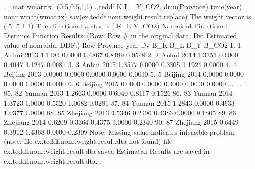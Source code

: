 . 
. mat wmatrix=(0.5,0.5,1,1)
{\smallskip}
. teddf K L= Y: CO2, dmu(Province) time(year) nonr wmat(wmatrix) sav(ex.teddf.nonr.weight.result,replace)
{\smallskip}
 The weight vector is (.5 .5 1 1)
{\smallskip}
 The directional vector is (-K -L Y -CO2)
{\smallskip}
{\smallskip}
 Nonraidal Directional Distance Function Results:
    (Row: Row \# in the original data; Dv: Estimated value of nonraidal DDF.)
{\smallskip}
     {\TLC}
     {\VBAR} Row       Province   year       Dv      B_K      B_L      B_Y    B_CO2 {\VBAR}
     {\LFTT}
  1. {\VBAR}   1          Anhui   2013   1.1480   0.0000   0.4867   0.8499   0.0548 {\VBAR}
  2. {\VBAR}   2          Anhui   2014   1.3351   0.0000   0.4047   1.1247   0.0081 {\VBAR}
  3. {\VBAR}   3          Anhui   2015   1.3577   0.0000   0.3305   1.1924   0.0000 {\VBAR}
  4. {\VBAR}   4        Beijing   2013   0.0000   0.0000   0.0000   0.0000   0.0000 {\VBAR}
  5. {\VBAR}   5        Beijing   2014   0.0000   0.0000   0.0000   0.0000   0.0000 {\VBAR}
  6. {\VBAR}   6        Beijing   2015   0.0000   0.0000   0.0000   0.0000   0.0000 {\VBAR}
                                     ...
                                     ...
                                     ...
 85. {\VBAR}  82         Yunnan   2013   1.2663   0.0000   0.6040   0.8117   0.1526 {\VBAR}
 86. {\VBAR}  83         Yunnan   2014   1.3723   0.0000   0.5520   1.0682   0.0281 {\VBAR}
 87. {\VBAR}  84         Yunnan   2015   1.2843   0.0000   0.4933   1.0377   0.0000 {\VBAR}
 88. {\VBAR}  85       Zhejiang   2013   0.5346   0.2696   0.4386   0.0000   0.1805 {\VBAR}
 89. {\VBAR}  86       Zhejiang   2014   0.6209   0.3364   0.4375   0.0000   0.2340 {\VBAR}
 90. {\VBAR}  87       Zhejiang   2015   0.6449   0.3912   0.4368   0.0000   0.2309 {\VBAR}
     {\BLC}
Note: Missing value indicates infeasible problem.
(note: file ex.teddf.nonr.weight.result.dta not found)
file ex.teddf.nonr.weight.result.dta saved
{\smallskip}
Estimated Results are saved in ex.teddf.nonr.weight.result.dta.
{\smallskip}
. 

